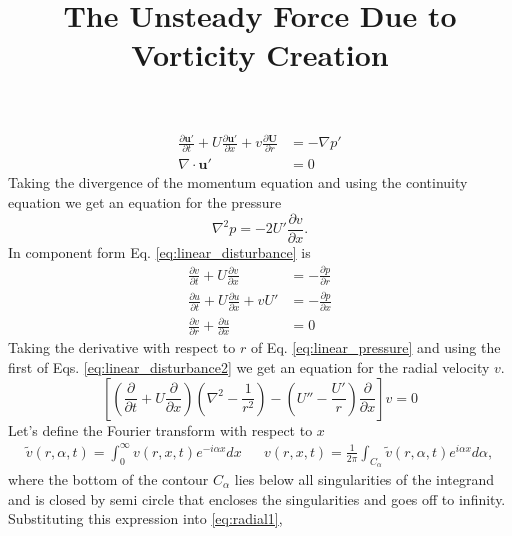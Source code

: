 \documentclass[superscriptaddress, onecolumn, prl]{revtex4}
\begin{document}
\title{The Unsteady Force Due to Vorticity Creation}
\maketitle

\begin{equation}
\begin{split}
\label{eq:linear_disturbance1}
\frac{\partial \textbf{u}' }{\partial t} + U \frac{\partial \textbf{u}'}{\partial x} + v \frac{\partial \textbf{U}}{\partial r} &= -\nabla p' \\
\nabla \cdot \textbf{u}' &= 0 
\end{split}
\end{equation}
Taking the divergence of the momentum equation and using the continuity equation we get an equation for the pressure
\begin{equation}
\label{eq:linear_pressure}
\nabla^2 p = - 2 U' \frac{\partial v}{\partial x}.
\end{equation}
In component form Eq. \ref{eq:linear_disturbance} is
\begin{equation}
\label{eq:linear_disturbance2}
\begin{split}
\frac{\partial v}{\partial t} + U \frac{\partial v}{\partial x} &= -\frac{\partial p}{\partial r} \\ 
\frac{\partial u}{\partial t} + U \frac{\partial u}{\partial x} + v U' &= - \frac{\partial p}{\partial x} \\
\frac{\partial v}{\partial r} + \frac{\partial u}{\partial x} & = 0
\end{split}
\end{equation}
Taking the derivative with respect to $r$ of Eq. \ref{eq:linear_pressure} and using the first of Eqs. \ref{eq:linear_disturbance2} we get an equation for the radial velocity $v$.
\begin{equation}
\label{eq:radial1}
\left[ \left( \frac{\partial}{\partial t} + U \frac{\partial}{\partial x} \right) \left( \nabla^2 - \frac{1}{r^2} \right) - \left( U'' - \frac{U'}{r} \right) \frac{\partial}{\partial x} \right] v = 0
\end{equation}
Let's define the Fourier transform with respect to $x$
\begin{align}
\tilde{v}(r, \alpha,t) = \int_0^\infty v (r, x, t) e^{-i \alpha x} dx &&
v(r,x,t) = \frac{1}{2 \pi}\int_{C_\alpha} \tilde{v} (r, \alpha, t) e^{i \alpha x} d \alpha,
\end{align}
where the bottom of the contour $C_\alpha$ lies below all singularities of the integrand and is closed by semi circle that encloses the singularities and goes off to infinity. Substituting this expression into \ref{eq:radial1},
\end{document}
